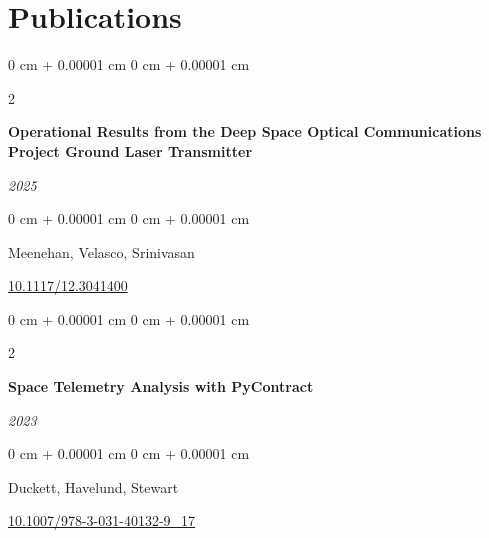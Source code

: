 \documentclass[10pt, letterpaper]{article}
\newenvironment{onecolentry}{
    \begin{adjustwidth}{
        0 cm + 0.00001 cm
    }{
        0 cm + 0.00001 cm
    }
}{
    \end{adjustwidth}
} %
\newenvironment{twocolentry}[2][]{
    \onecolentry
    \def\secondColumn{#2}
    \setcolumnwidth{\fill, 4.5 cm}
    \begin{paracol}{2}
}{
    \switchcolumn \raggedleft \secondColumn
    \end{paracol}
    \endonecolentry
} %
\begin{document}
    \vspace{0.20 cm}
    
    \section{Publications}
       
        \begin{samepage}
            \begin{twocolentry}{
                \textit{\small 2025}
            }
                \textbf{Operational Results from the Deep Space Optical Communications Project Ground Laser Transmitter}
            \end{twocolentry}

            \vspace{0.10 cm}
            
            \begin{onecolentry}
                \mbox{Meenehan}, \mbox{Velasco}, \mbox{Srinivasan}

                \vspace{0.10 cm}

                \href{https://doi.org/10.1117/12.3041400}{10.1117/12.3041400}
            \end{onecolentry}
        \end{samepage}

        \vspace{0.20 cm}
        \begin{samepage}
            \begin{twocolentry}{
                \textit{\small 2023}
            }
                \textbf{Space Telemetry Analysis with PyContract}
            \end{twocolentry}

            \vspace{0.10 cm}
            
            \begin{onecolentry}
                \mbox{Duckett}, \mbox{Havelund}, \mbox{Stewart}

                \vspace{0.10 cm}
                
                \href{https://doi.org/10.1007/978-3-031-40132-9_17}{10.1007/978-3-031-40132-9\_17}
            \end{onecolentry}
        \end{samepage}

    \vspace{0.30 cm}
    
\end{document}
